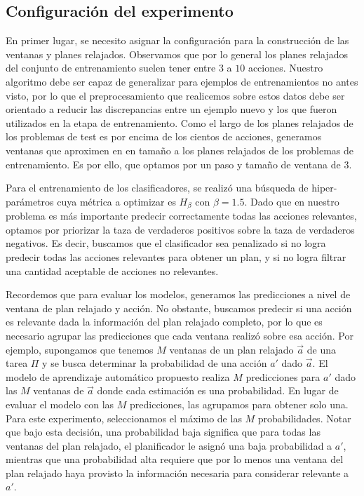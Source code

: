 \subsection{Configuración del experimento}

En primer lugar, se necesito asignar la configuración para la construcción de
las ventanas y planes relajados.  Observamos que por lo general los planes
relajados del conjunto de entrenamiento suelen tener entre $3$ a $10$ acciones.
Nuestro algoritmo debe ser capaz de generalizar para ejemplos de entrenamientos
no antes visto, por lo que el preprocesamiento que realicemos sobre estos datos
debe ser orientado a reducir las discrepancias entre un ejemplo nuevo y los que
fueron utilizados en la etapa de entrenamiento. Como el largo de los planes
relajados de los problemas de test es por encima de los cientos de acciones,
generamos ventanas que aproximen en en tamaño a los planes relajados de los
problemas de entrenamiento. Es por ello, que optamos por un paso y tamaño de
ventana de $3$.

Para el entrenamiento de los clasificadores, se realizó una búsqueda de
hiper-parámetros cuya métrica a optimizar es $H_{\beta}$ con $\beta = 1.5$. Dado
que en nuestro problema es más importante predecir correctamente todas las
acciones relevantes, optamos por priorizar la taza de verdaderos positivos sobre
la taza de verdaderos negativos. Es decir, buscamos que el clasificador sea
penalizado si no logra predecir todas las acciones relevantes para obtener un
plan, y si no logra filtrar una cantidad aceptable de acciones no relevantes.

Recordemos que para evaluar los modelos, generamos las predicciones a nivel de
ventana de plan relajado y acción. No obstante, buscamos predecir si una acción
es relevante dada la información del plan relajado completo, por lo que es
necesario agrupar las predicciones que cada ventana realizó sobre esa acción.
Por ejemplo, supongamos que tenemos $M$ ventanas de un plan relajado $\vec{a}$
de una tarea $\Pi$ y se busca determinar la probabilidad de una acción $a'$ dado
$\vec{a}$. El modelo de aprendizaje automático propuesto realiza $M$
predicciones para $a'$ dado las $M$ ventanas de $\vec{a}$ donde cada estimación
es una probabilidad. En lugar de evaluar el modelo con las $M$ predicciones, las
agrupamos para obtener solo una. Para este experimento, seleccionamos el máximo
de las $M$ probabilidades. Notar que bajo esta decisión, una probabilidad baja
significa que para todas las ventanas del plan relajado, el planificador le
asignó una baja probabilidad a $a'$, mientras que una probabilidad alta requiere
que por lo menos una ventana del plan relajado haya provisto la información
necesaria para considerar relevante a $a'$.


